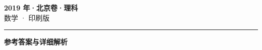 \documentclass[zihao=5, a4paper]{ctexart}
\begin{document}
\begin{center}
  {\Large\bfseries 2019 年·北京卷·理科}\\[4pt]
  {\large 数学 · 印刷版}
\end{center}
\medskip
{}

\par\bigskip\hrule\bigskip
{}
\begin{center}{\large\bfseries 参考答案与详细解析}\end{center}
\smallskip

\end{document}
